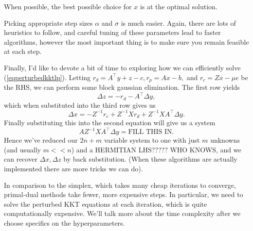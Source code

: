 \documentclass{article}
\numberwithin{equation}{section}
\theoremstyle{definition}
\begin{document}
When possible, the best possible choice for $x$ is at the optimal solution.

Picking appropriate step sizes $\alpha$ and $\sigma$ is much easier. Again, there are lots of heuristics to follow, and careful tuning of these parameters lead to faster algorithms, however the most important thing is to make sure you remain feasible at each step.

Finally, I'd like to devote a bit of time to exploring how we can efficiently solve (\ref{eqperturbedkktlp}). Letting $r_d=A^\top y+z-c, r_p= Ax-b,$ and $r_c=Zx-\mu e$ be the RHS, we can perform some block gaussian elimination. The first row yields
\begin{equation}
    \Delta z=-r_d-A^\top\Delta y,
\end{equation}
which when substituted into the third row gives us
\begin{equation}
    \Delta x=-Z^{-1}r_c+Z^{-1}Xr_d+Z^{-1}XA^\top\Delta y.
\end{equation}
Finally substituting this into the second equation will give us a system
\begin{equation}
    AZ^{-1}XA^\top\Delta y=\text{FILL THIS IN}.
\end{equation}
Hence we've reduced our $2n+m$ variable system to one with just $m$ unknowns (and usually $m<<n$) and a HERMITIAN LHS????? WHO KNOWS, and we can recover $\Delta x, \Delta z$ by back substitution. (When these algorithms are actually implemented there are more tricks we can do).

In comparison to the simplex, which takes many cheap iterations to converge, primal-dual methods take fewer, more expensive steps. In particular, we need to solve the perturbed KKT equations at each iteration, which is quite computationally expensive. We'll talk more about the time complexity after we choose specifics on the hyperparameters.
\end{document}
